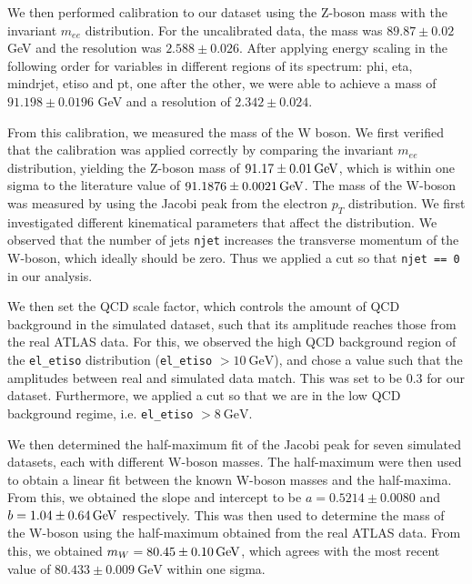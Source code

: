 \documentclass[a4paper]{report}
\numberwithin{equation}{section}
\begin{document}
We then performed calibration to our dataset using the Z-boson mass with the invariant $m_{ee}$ distribution. For the uncalibrated data, the mass was $89.87 \pm 0.02$ GeV and the resolution was $2.588 \pm 0.026$. After applying energy scaling in the following order for variables in different regions of its spectrum: phi, eta, mindrjet, etiso and pt, one after the other, we were able to achieve a mass of $91.198 \pm 0.0196$ GeV and a resolution of $2.342 \pm 0.024$. \par 

From this calibration, we measured the mass of the W boson. We first verified that the calibration was applied correctly by 
comparing the invariant $m_{ee}$ distribution, yielding the Z-boson mass of $\SI{91.17 \pm 0.01}{\giga\electronvolt}$, which 
is within one sigma to the literature value of $\SI{91.1876 \pm 0.0021}{\giga\electronvolt}$. The mass of the W-boson was measured by using the Jacobi peak from the 
electron $p_T$ distribution. We first investigated different kinematical parameters that affect the distribution. We observed 
that the number of jets \texttt{njet} increases the transverse momentum of the W-boson, which ideally should be zero. Thus we 
applied a cut so that \texttt{njet == 0} in our analysis.

We then set the QCD scale factor, which controls the amount of QCD background in the simulated 
dataset, such that its amplitude reaches those from the real ATLAS data. For this, we observed the high QCD background 
region of the \texttt{el\_etiso} distribution (\texttt{el\_etiso} $> \SI{10}{\giga\electronvolt}$), and chose a value such that 
the amplitudes between real and simulated data match. This was set to be 0.3 for our dataset. Furthermore, we applied a cut 
so that we are in the low QCD background regime, i.e. \texttt{el\_etiso} $> \SI{8}{\giga\electronvolt}$. \par 

We then determined the half-maximum fit of the Jacobi peak for seven simulated datasets, each with different W-boson masses. 
The half-maximum were then used to obtain a linear fit between the known W-boson masses and the half-maxima. From this, we obtained 
the slope and intercept to be $a = 0.5214 \pm 0.0080$ and $b = \SI{1.04 \pm 0.64}{\giga\electronvolt}$ respectively. This was then 
used to determine the mass of the W-boson using the half-maximum obtained from the real ATLAS data. From this, we obtained 
$m_W = \SI{80.45 \pm 0.10}{\giga\electronvolt}$, which agrees with the most recent value of $80.433 \pm 0.009 \ \text{GeV}$ 
within one sigma. \par 
\end{document}
